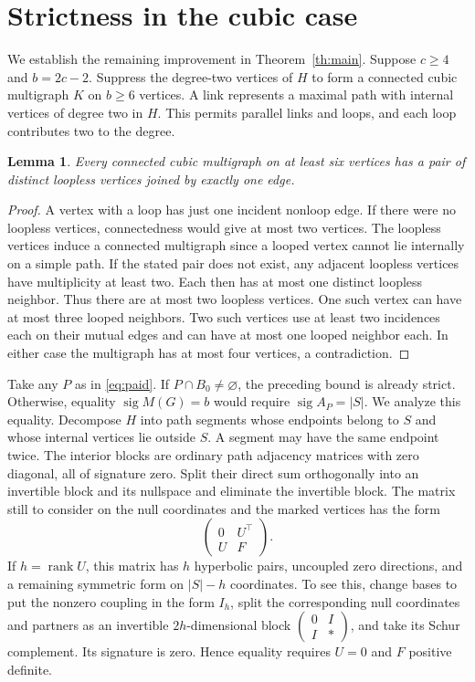 \documentclass[11pt]{article}
\newtheorem{lemma}[theorem]{Lemma}
\newcommand{\sg}{\operatorname{sig}}
\begin{document}
\section{Strictness in the cubic case}
We establish the remaining improvement in Theorem~\ref{th:main}. Suppose $c\ge4$ and $b=2c-2$. Suppress the degree-two vertices of $H$ to form a connected cubic multigraph $K$ on $b\ge6$ vertices. A link represents a maximal path with internal vertices of degree two in $H$. This permits parallel links and loops, and each loop contributes two to the degree.

\begin{lemma}\label{lem:link}
Every connected cubic multigraph on at least six vertices has a pair of distinct loopless vertices joined by exactly one edge.
\end{lemma}
\begin{proof}
A vertex with a loop has just one incident nonloop edge. If there were no loopless vertices, connectedness would give at most two vertices. The loopless vertices induce a connected multigraph since a looped vertex cannot lie internally on a simple path. If the stated pair does not exist, any adjacent loopless vertices have multiplicity at least two. Each then has at most one distinct loopless neighbor. Thus there are at most two loopless vertices. One such vertex can have at most three looped neighbors. Two such vertices use at least two incidences each on their mutual edges and can have at most one looped neighbor each. In either case the multigraph has at most four vertices, a contradiction.
\end{proof}

Take any $P$ as in \eqref{eq:paid}. If $P\cap B_0\ne\varnothing$, the preceding bound is already strict. Otherwise, equality $\sg M(G)=b$ would require $\sg A_P=|S|$. We analyze this equality. Decompose $H$ into path segments whose endpoints belong to $S$ and whose internal vertices lie outside $S$. A segment may have the same endpoint twice. The interior blocks are ordinary path adjacency matrices with zero diagonal, all of signature zero. Split their direct sum orthogonally into an invertible block and its nullspace and eliminate the invertible block. The matrix still to consider on the null coordinates and the marked vertices has the form
\[
 \begin{pmatrix}0&U^\top\\ U&F\end{pmatrix}.
\]
If $h=\operatorname{rank}U$, this matrix has $h$ hyperbolic pairs, uncoupled zero directions, and a remaining symmetric form on $|S|-h$ coordinates. To see this, change bases to put the nonzero coupling in the form $I_h$, split the corresponding null coordinates and partners as an invertible $2h$-dimensional block $\left(\begin{smallmatrix}0&I\\I&*\end{smallmatrix}\right)$, and take its Schur complement. Its signature is zero. Hence equality requires $U=0$ and $F$ positive definite.
\end{document}
